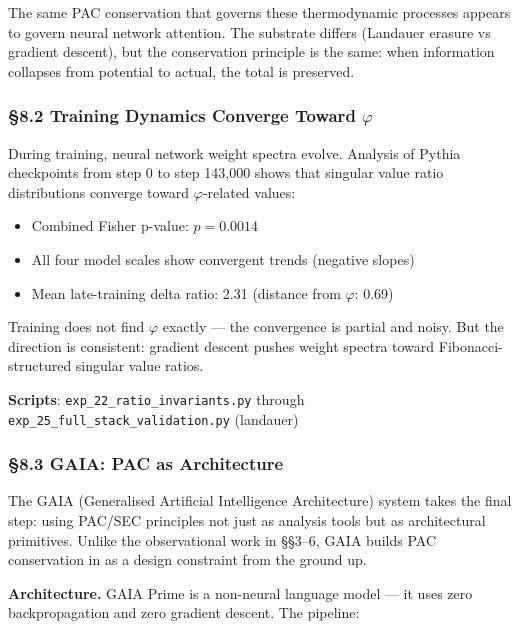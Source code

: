 \documentclass[
  11pt,
  a4paper]{article}
\providecommand{\tightlist}{%
  \setlength{\itemsep}{0pt}\setlength{\parskip}{0pt}}
\begin{document}
The same PAC conservation that governs these thermodynamic processes
appears to govern neural network attention. The substrate differs
(Landauer erasure vs gradient descent), but the conservation principle
is the same: when information collapses from potential to actual, the
total is preserved.

\subsubsection{\texorpdfstring{§8.2 Training Dynamics Converge Toward
\(\varphi\)}{§8.2 Training Dynamics Converge Toward \textbackslash varphi}}\label{training-dynamics-converge-toward-varphi}

During training, neural network weight spectra evolve. Analysis of
Pythia checkpoints from step 0 to step 143,000 shows that singular value
ratio distributions converge toward \(\varphi\)-related values:

\begin{itemize}
\tightlist
\item
  Combined Fisher p-value: \(p = 0.0014\)
\item
  All four model scales show convergent trends (negative slopes)
\item
  Mean late-training delta ratio: 2.31 (distance from \(\varphi\): 0.69)
\end{itemize}

Training does not find \(\varphi\) exactly --- the convergence is
partial and noisy. But the direction is consistent: gradient descent
pushes weight spectra toward Fibonacci-structured singular value ratios.

\textbf{Scripts}: \texttt{exp\_22\_ratio\_invariants.py} through
\texttt{exp\_25\_full\_stack\_validation.py} (landauer)

\subsubsection{§8.3 GAIA: PAC as
Architecture}\label{gaia-pac-as-architecture}

The GAIA (Generalised Artificial Intelligence Architecture) system takes
the final step: using PAC/SEC principles not just as analysis tools but
as architectural primitives. Unlike the observational work in §§3--6,
GAIA builds PAC conservation in as a design constraint from the ground
up.

\textbf{Architecture.} GAIA Prime is a non-neural language model --- it
uses zero backpropagation and zero gradient descent. The pipeline:
\end{document}
